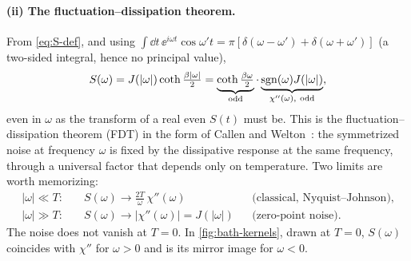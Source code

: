 \paragraph{(ii) The fluctuation--dissipation theorem.}
From \cref{eq:S-def}, and using $\int\dd t\,\ee^{i\omega t}\cos\omega't=\pi[\delta(\omega-\omega')+\delta(\omega+\omega')]$ (a two-sided integral, hence no principal value),
\begin{equation}
  S(\omega)=J(|\omega|)\coth\tfrac{\beta|\omega|}{2}=\underbrace{\coth\tfrac{\beta\omega}{2}}_{\text{odd}}\cdot\underbrace{\sgn(\omega)J(|\omega|)}_{\chi''(\omega),\ \text{odd}},
\end{equation}
even in $\omega$ as the transform of a real even $S(t)$ must be.
This is the fluctuation--dissipation theorem (FDT) in the form of Callen and Welton~\cite{CallenWelton1951,Kubo1966}: the symmetrized noise at frequency $\omega$ is fixed by the dissipative response at the same frequency, through a universal factor that depends only on temperature.
Two limits are worth memorizing:
\begin{equation}
\begin{aligned}
  |\omega|\ll T:&\quad S(\omega)\to\frac{2T}{\omega}\,\chi''(\omega)&&\text{(classical, Nyquist--Johnson)},\\
  |\omega|\gg T:&\quad S(\omega)\to|\chi''(\omega)|=J(|\omega|)&&\text{(zero-point noise)}.
\end{aligned}
\end{equation}
The noise does not vanish at $T=0$.
In \cref{fig:bath-kernels}, drawn at $T=0$, $S(\omega)$ coincides with $\chi''$ for $\omega>0$ and is its mirror image for $\omega<0$.


